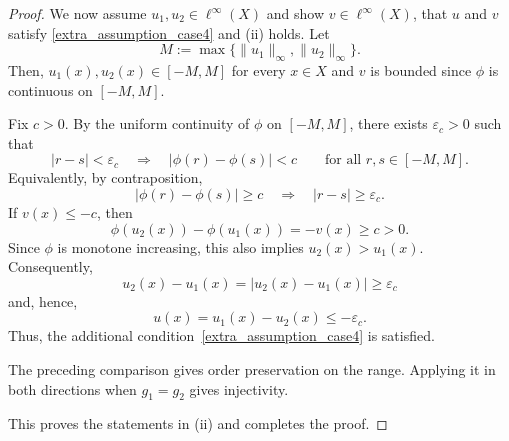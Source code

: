 \documentclass[10pt,a4paper]{amsart}
\begin{document}
\begin{proof}
{{We now assume $u_1,u_2 \in \ell^\infty(X)$ and show $v \in \ell^\infty(X)$, 
that $u$ and $v$ satisfy \eqref{extra_assumption_case4} and (ii) holds.}
Let
\[
 M:=\max\{\|u_1\|_\infty,\|u_2\|_\infty\}.
\]
Then, $u_1(x),u_2(x)\in[-M,M]$ for every $x\in X$ and $v$ is
bounded since $\phi$ is continuous on $[-M,M]$.

Fix $c>0$. By the uniform continuity of $\phi$ on $[-M,M]$, there exists
$\varepsilon_c>0$ such that
\[
 |r-s|<\varepsilon_c
 \quad\Longrightarrow\quad
 |\phi(r)-\phi(s)|<c
 \qquad\text{for all }r,s\in[-M,M].
\]
Equivalently, by contraposition,
\[
 |\phi(r)-\phi(s)|\geq c
 \quad\Longrightarrow\quad
 |r-s|\geq\varepsilon_c.
\]
If $v(x)\leq-c$, then
\[
 \phi(u_2(x))-\phi(u_1(x))=-v(x)\geq c>0.
\]
Since $\phi$ is monotone increasing, this also implies $u_2(x)>u_1(x)$.
Consequently,
\[
 u_2(x)-u_1(x)
 =
 |u_2(x)-u_1(x)|
 \geq\varepsilon_c
\]
and, hence,
\[
 u(x)=u_1(x)-u_2(x)\leq-\varepsilon_c.
\]
Thus, the additional condition~\eqref{extra_assumption_case4} is
satisfied.

The preceding comparison gives order preservation on the range.
Applying it in both directions when $g_1=g_2$ gives injectivity.}
{ This proves the statements in (ii) and completes the proof.}

\end{proof}
\end{document}
